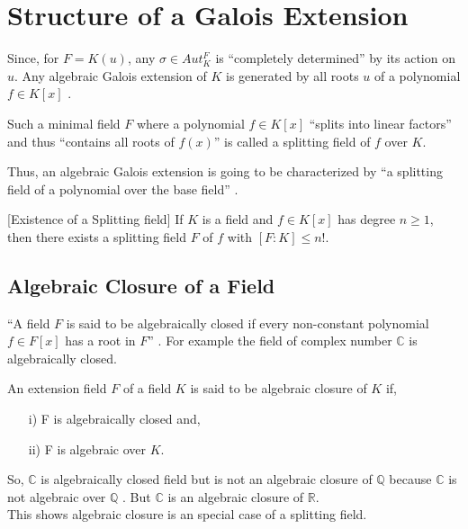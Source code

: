 \section{Structure of a Galois Extension}
Since, for \(F=K(u)\), any \(\sigma \in Aut_K^F\) is ``completely determined'' \cite{hunger} by its action on \(u\). Any algebraic Galois extension of \(K\) is generated by all roots \(u\) of a polynomial \(f \in K[x]\) \cite{hunger}.

\begin{definition} \cite{hunger}
  Such a minimal field \(F\) where a polynomial \(f \in K[x]\) ``splits into linear factors'' and thus ``contains all roots of \(f(x)\)'' is called a splitting field of \(f\) over \(K\).
\end{definition}
Thus, an algebraic Galois extension is going to be characterized by ``a splitting field of a polynomial over the base field'' \cite{hunger}.
\vspace{3mm}

\begin{theorem} \cite{hunger} [Existence of a Splitting field]
  If \(K\) is a field and \(f \in K[x]\) has degree \(n \geq 1\), then there exists a splitting field \(F\) of \(f\) with \([F:K] \leq n!\).
  \end{theorem}

\subsection{Algebraic Closure of a Field}
``A field \(F\) is said to be algebraically closed if every non-constant polynomial \(f \in F[x]\) has a root in \(F\)'' \cite{hunger}.
For example the field of complex number \(\mathbb{C}\) is algebraically closed.\\[3mm]

\begin{definition} \cite{hunger}
An extension field \(F\) of a field \(K\) is said to be algebraic closure of \(K\) if,
\begin{enumerate}
\item[i)] F is algebraically closed and,
  \item[ii)] F is algebraic over \(K\).
  \end{enumerate}
\end{definition}


So, \(\mathbb{C}\) is algebraically closed field but is not an algebraic closure of \(\mathbb{Q}\) because \(\mathbb{C}\) is not algebraic over \(\mathbb{Q}\) \cite{hunger}.
But \(\mathbb{C}\) is an algebraic closure of \(\mathbb{R}\).\\
This shows algebraic closure is an special case of a splitting field.

